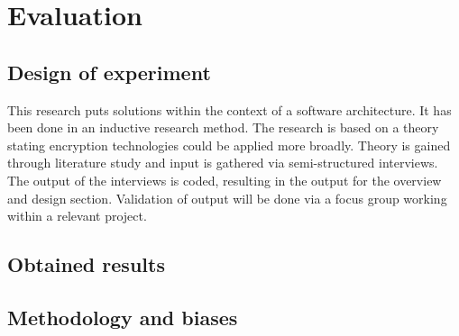 \chapter{Evaluation}\label{s:evaluation}

\section{Design of experiment}
This research puts solutions within the context of a software architecture. It has been done in an inductive research method. The research is based on a theory stating encryption technologies
could be applied more broadly. Theory is gained through literature study and input is gathered via semi-structured interviews. The output of the interviews is coded, resulting in the output for the overview and design section. Validation of output will be done via a focus group working within a relevant project.

\section{Obtained results}

\section{Methodology and biases}


